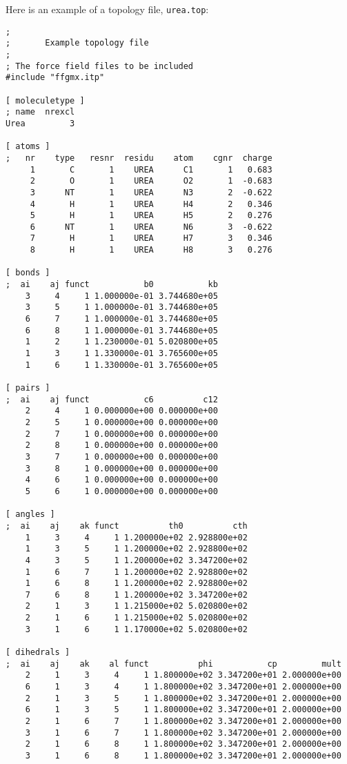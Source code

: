 Here is an example of a topology file, \verb'urea.top':
{\small\begin{verbatim}
;
;       Example topology file
;
; The force field files to be included
#include "ffgmx.itp"    

[ moleculetype ]
; name  nrexcl
Urea         3

[ atoms ]
;   nr    type   resnr  residu    atom    cgnr  charge
     1       C       1    UREA      C1       1   0.683  
     2       O       1    UREA      O2       1  -0.683
     3      NT       1    UREA      N3       2  -0.622
     4       H       1    UREA      H4       2   0.346
     5       H       1    UREA      H5       2   0.276
     6      NT       1    UREA      N6       3  -0.622
     7       H       1    UREA      H7       3   0.346
     8       H       1    UREA      H8       3   0.276

[ bonds ]
;  ai    aj funct           b0           kb
    3     4     1 1.000000e-01 3.744680e+05 
    3     5     1 1.000000e-01 3.744680e+05 
    6     7     1 1.000000e-01 3.744680e+05 
    6     8     1 1.000000e-01 3.744680e+05 
    1     2     1 1.230000e-01 5.020800e+05 
    1     3     1 1.330000e-01 3.765600e+05 
    1     6     1 1.330000e-01 3.765600e+05 

[ pairs ]
;  ai    aj funct           c6          c12
    2     4     1 0.000000e+00 0.000000e+00 
    2     5     1 0.000000e+00 0.000000e+00 
    2     7     1 0.000000e+00 0.000000e+00 
    2     8     1 0.000000e+00 0.000000e+00 
    3     7     1 0.000000e+00 0.000000e+00 
    3     8     1 0.000000e+00 0.000000e+00 
    4     6     1 0.000000e+00 0.000000e+00 
    5     6     1 0.000000e+00 0.000000e+00 

[ angles ]
;  ai    aj    ak funct          th0          cth
    1     3     4     1 1.200000e+02 2.928800e+02 
    1     3     5     1 1.200000e+02 2.928800e+02 
    4     3     5     1 1.200000e+02 3.347200e+02 
    1     6     7     1 1.200000e+02 2.928800e+02 
    1     6     8     1 1.200000e+02 2.928800e+02 
    7     6     8     1 1.200000e+02 3.347200e+02 
    2     1     3     1 1.215000e+02 5.020800e+02 
    2     1     6     1 1.215000e+02 5.020800e+02 
    3     1     6     1 1.170000e+02 5.020800e+02 

[ dihedrals ]
;  ai    aj    ak    al funct          phi           cp         mult
    2     1     3     4     1 1.800000e+02 3.347200e+01 2.000000e+00 
    6     1     3     4     1 1.800000e+02 3.347200e+01 2.000000e+00 
    2     1     3     5     1 1.800000e+02 3.347200e+01 2.000000e+00 
    6     1     3     5     1 1.800000e+02 3.347200e+01 2.000000e+00 
    2     1     6     7     1 1.800000e+02 3.347200e+01 2.000000e+00 
    3     1     6     7     1 1.800000e+02 3.347200e+01 2.000000e+00 
    2     1     6     8     1 1.800000e+02 3.347200e+01 2.000000e+00 
    3     1     6     8     1 1.800000e+02 3.347200e+01 2.000000e+00 


\end{verbatim}}
